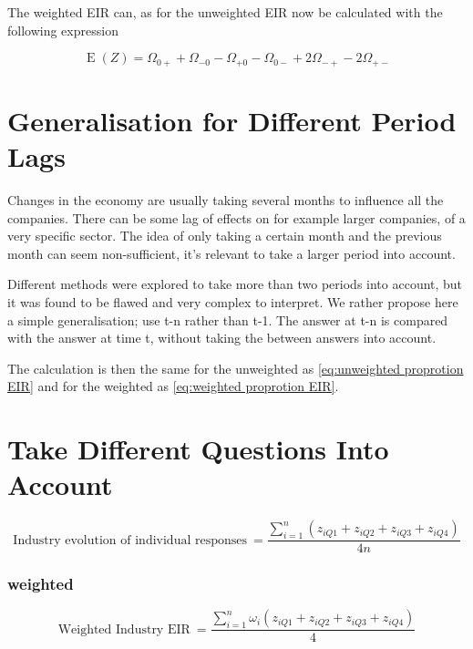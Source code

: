 \documentclass[12pt,a4paper,oneside]{book}
\DeclareMathOperator{\E}{E}
\begin{document}
The weighted EIR can, as for the unweighted EIR now be calculated with the following expression 

\begin{equation}
    \E(Z) = \Omega_{0+} + \Omega_{-0} - \Omega_{+0} - \Omega_{0-} +2\Omega_{-+} -2\Omega_{+-} \label{eq:weighted proprotion EIR}
\end{equation}


\section{Generalisation for Different Period Lags}

Changes in the economy are usually taking several months to influence all the companies. There can be some lag of effects on for example larger companies, of a very specific sector.
The idea of only taking a certain month and the previous month can seem non-sufficient, it's relevant to take a larger period into account. 

Different methods were explored to take more than two periods into account, but it was found to be flawed and very complex to interpret.
We rather propose here a simple generalisation; use t-n rather than t-1. 
The answer at t-n is compared with the answer at time t, without taking the between answers into account.

The calculation is then the same for the unweighted as \autoref{eq:unweighted proprotion EIR} and for the weighted as \autoref{eq:weighted proprotion EIR}.


\section{Take Different Questions Into Account}


\begin{equation}
    \mbox{Industry evolution of individual responses}\ = \frac{\sum_{i=1}^n \left(z_{i Q1} + z_{i Q2} + z_{i Q3} + z_{i Q4} \right)}{4n}
\end{equation}





\subsubsection{weighted}

\begin{equation}
    \mbox{Weighted Industry EIR}\ = \frac{ \sum_{i=1}^n \omega_i \left(z_{i Q1} + z_{i Q2} + z_{i Q3} + z_{i Q4} \right)}{4}
\end{equation}
\end{document}
